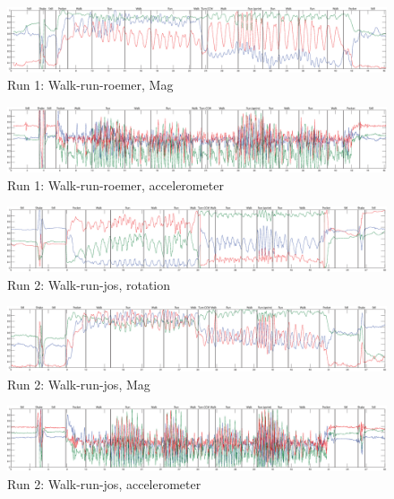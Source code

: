 \begin{figure}
\centering
  \includegraphics[width=1\textwidth]{./Figures/chapter6/data_collection/run-1-walk-run-roemer/data_plot_mag_annotated.eps}
  \caption[R1: mag]{Run 1: Walk-run-roemer, Mag}
\end{figure}

\begin{figure}
\centering
  \includegraphics[width=1\textwidth]{./Figures/chapter6/data_collection/run-1-walk-run-roemer/data_plot_acc_annotated.eps}
  \caption[R1: accelerometer]{Run 1: Walk-run-roemer, accelerometer}
\end{figure}

\begin{figure}
\centering
  \includegraphics[width=1\textwidth]{./Figures/chapter6/data_collection/run-2-walk-run-jos/data_plot_rot_annotated.eps}
  \caption[R2: rotation]{Run 2: Walk-run-jos, rotation}
\end{figure}

\begin{figure}
\centering
  \includegraphics[width=1\textwidth]{./Figures/chapter6/data_collection/run-2-walk-run-jos/data_plot_mag_annotated.eps}
  \caption[R2: mag]{Run 2: Walk-run-jos, Mag}
\end{figure}

\begin{figure}
\centering
  \includegraphics[width=1\textwidth]{./Figures/chapter6/data_collection/run-2-walk-run-jos/data_plot_acc_annotated.eps}
  \caption[R2: accelerometer]{Run 2: Walk-run-jos, accelerometer}
\end{figure}

